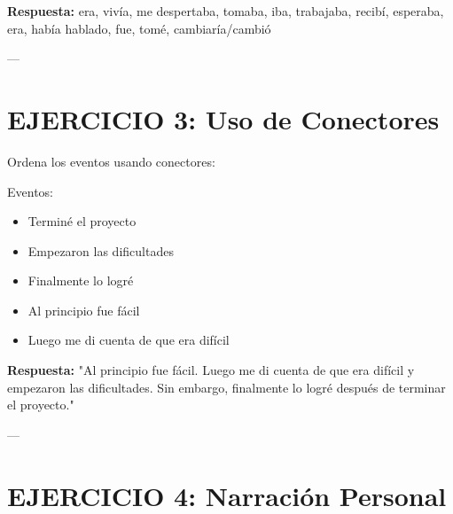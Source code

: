 \documentclass[a4paper,11pt]{article}
\begin{document}
\vspace{0.2cm}

\textbf{Respuesta:} era, vivía, me despertaba, tomaba, iba, trabajaba, recibí, esperaba, era, había hablado, fue, tomé, cambiaría/cambió

\vspace{0.2cm}

---

\vspace{0.2cm}

\section{EJERCICIO 3: Uso de Conectores}

\vspace{0.2cm}

Ordena los eventos usando conectores:

\vspace{0.2cm}

Eventos:

\begin{itemize}

  \item Terminé el proyecto

  \item Empezaron las dificultades

  \item Finalmente lo logré

  \item Al principio fue fácil

  \item Luego me di cuenta de que era difícil

\end{itemize}

\vspace{0.2cm}

\textbf{Respuesta:} "Al principio fue fácil. Luego me di cuenta de que era difícil y empezaron las dificultades. Sin embargo, finalmente lo logré después de terminar el proyecto."

\vspace{0.2cm}

---

\vspace{0.2cm}

\section{EJERCICIO 4: Narración Personal}
\end{document}
